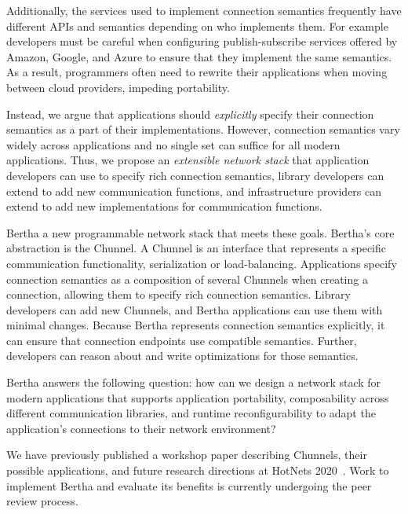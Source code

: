 \documentclass[fontsize=12pt,paper=letter]{scrartcl}
\newcommand{\tunnel}{Chunnel\xspace}
\newcommand{\tunnels}{Chunnels\xspace}
\begin{document}
Additionally, the services used to implement connection semantics frequently have different APIs and semantics depending on who implements them. 
For example developers must be careful when configuring publish-subscribe services offered by Amazon, Google, and Azure to ensure that they implement the same semantics. As a result, programmers often need to rewrite their applications when moving between cloud providers, impeding portability. 

Instead, we argue that applications should \emph{explicitly} specify their connection semantics as a part of their implementations. However, connection semantics vary widely across applications and no single set can suffice for all modern applications.
Thus, we propose an \emph{extensible network stack} that application developers can use to specify rich connection semantics, library developers can extend to add new communication functions, and infrastructure providers can extend to add new implementations for communication functions.

Bertha a new programmable network stack that meets these goals.
Bertha's core abstraction is the \tunnel. A \tunnel is an interface that represents a specific communication functionality, \eg serialization or load-balancing. Applications specify connection semantics as a composition of several \tunnels when creating a connection, allowing them to specify rich connection semantics. Library developers can add new \tunnels, and
Bertha applications can use them with minimal changes.
Because Bertha represents connection semantics explicitly, it can ensure that connection endpoints use compatible semantics. Further, developers can reason about and write optimizations for those semantics. 

Bertha answers the following question: how can we design a network stack for modern applications that supports application portability, composability across different communication libraries, and runtime reconfigurability to adapt the application's connections to their network environment?

We have previously published a workshop paper describing \tunnels, their possible applications, and future research directions at HotNets 2020~\cite{bertha-hotnets}. 
Work to implement Bertha and evaluate its benefits is currently undergoing the peer review process.
\end{document}
